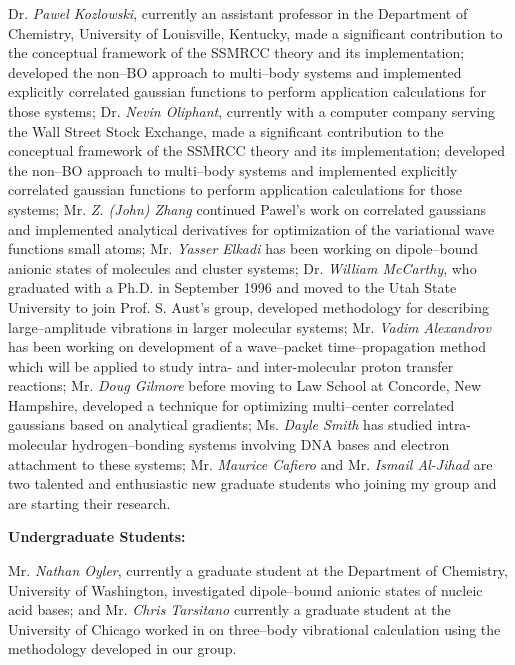 \noindent
Dr. {\em Pawel Kozlowski}, currently an assistant professor
in the Department of Chemistry, 
University of Louisville, Kentucky,
made a significant contribution to the conceptual
framework of the SSMRCC theory and its implementation;
developed the non--BO approach
to multi--body systems and implemented explicitly
correlated gaussian functions to perform application
calculations for those systems;
Dr. {\em Nevin Oliphant}, currently 
with a computer company serving the Wall Street Stock Exchange,
made a significant contribution to the conceptual 
framework of the SSMRCC theory and its implementation;
developed the non--BO approach 
to multi--body systems and implemented explicitly
correlated gaussian functions to perform application 
calculations for those systems; 
Mr. {\em Z. (John) Zhang}
continued Pawel's work on correlated gaussians and 
implemented analytical derivatives for optimization of the
variational wave functions small atoms;
Mr. {\em Yasser Elkadi}
has been working on 
dipole--bound anionic states of molecules and cluster
systems; 
Dr. {\em William McCarthy}, 
who graduated 
with a Ph.D. in September 1996 and moved to the Utah
State University to join Prof. S. Aust's group,  
developed methodology for describing
large--amplitude vibrations in larger molecular systems; 
Mr. {\em Vadim Alexandrov} has been working on
development of a wave--packet time--propagation method which will
be applied to study intra- and inter-molecular proton transfer
reactions; 
Mr. {\em Doug Gilmore} before moving to Law School at Concorde,
New Hampshire,
developed a technique for
optimizing multi--center correlated gaussians
based on analytical gradients; 
Ms. {\em Dayle Smith} 
has studied 
intra-molecular hydrogen--bonding
systems involving DNA bases and electron attachment to these
systems;   
Mr. {\em Maurice Cafiero} 
and Mr. {\em Ismail Al-Jihad} are two talented and 
enthusiastic new graduate students who
joining my group and are starting their research. 

\vspace{2mm}
\noindent
{\bf Undergraduate Students:}

\noindent
Mr. {\em Nathan Oyler}, 
currently a graduate student at the Department of
Chemistry, University of Washington, investigated 
dipole--bound anionic states of nucleic acid bases; and 
Mr. {\em Chris Tarsitano} currently a graduate student at the 
University of Chicago 
worked in  
on three--body vibrational calculation using the methodology
developed in our group.

